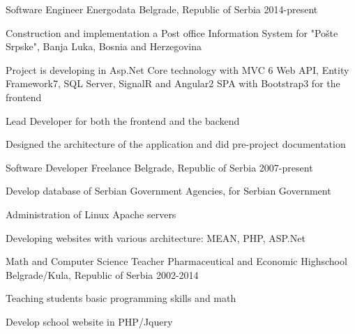 


\begin{cventries}


\cventry
{Software Engineer} %
{Energodata} %
{Belgrade, Republic of Serbia} %
{2014-present} %
{ %
\begin{cvitems}
\item {Construction and implementation a Post office Information System for "Pošte Srpske", Banja Luka, Bosnia and Herzegovina}
\item {Project is developing in Asp.Net Core technology with MVC 6 Web API, Entity Framework7, SQL Server, SignalR and Angular2 SPA with Bootstrap3 for the frontend}
\item {Lead Developer for both the frontend and the backend}
\item {Designed the architecture of the application and did pre-project documentation}
\end{cvitems}
}


\cventry
{Software Developer} %
{Freelance} %
{Belgrade, Republic of Serbia} %
{2007-present} %
{ %
\begin{cvitems}
\item {Develop database of Serbian Government Agencies, for Serbian Government}
\item {Administration of Linux Apache servers}
\item {Developing websites with various architecture: MEAN, PHP, ASP.Net}
\end{cvitems}
}


\cventry
{Math and Computer Science Teacher} %
{Pharmaceutical and Economic Highschool} %
{Belgrade/Kula, Republic of Serbia} %
{2002-2014} %
{ %
\begin{cvitems}
\item {Teaching students basic programming skills and math}
\item {Develop school website in PHP/Jquery}
\end{cvitems}
}


\end{cventries}
